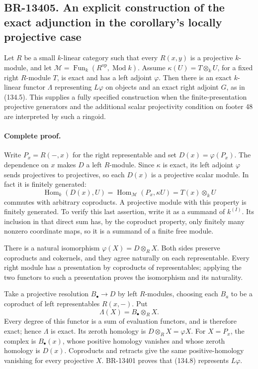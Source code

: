\subsection{BR-13405. An explicit construction of the exact adjunction in the corollary's locally projective case}
Let \(R\) be a small \(k\)-linear category such that every
\(R(x,y)\) is a projective \(k\)-module, and let
\(\mathcal M=\operatorname{Fun}_k(R^{\mathrm{op}},\operatorname{Mod}k)\).
Assume \(\kappa(U)=T\otimes_k U\), for a fixed right \(R\)-module
\(T\), is exact and has a left adjoint \(\varphi\).  Then there
is an exact \(k\)-linear functor \(\Lambda\) representing
\(L\varphi\) on objects and an exact right adjoint \(G\), as in
(134.5).  This supplies a fully specified construction when the
finite-presentation projective generators and the additional scalar
projectivity condition on footer 48 are interpreted by such a ringoid.

\paragraph{Complete proof.}
Write \(P_x=R(-,x)\) for the right representable and set
\(D(x)=\varphi(P_x)\).  The dependence on \(x\) makes \(D\) a
left \(R\)-module.  Since \(\kappa\) is exact, its left adjoint
\(\varphi\) sends projectives to projectives, so each \(D(x)\)
is a projective scalar module.  In fact it is finitely generated:
\[
 \operatorname{Hom}_k(D(x),U)
   =\operatorname{Hom}_{\mathcal M}(P_x,\kappa U)
   =T(x)\otimes_k U
\]
commutes with arbitrary coproducts.  A projective module with this
property is finitely generated.  To verify this last assertion, write
it as a summand of \(k^{(I)}\).  Its inclusion in that direct sum
has, by the coproduct property, only finitely many nonzero coordinate
maps, so it is a summand of a finite free module.

There is a natural isomorphism \(\varphi(X)=D\otimes_R X\).
Both sides preserve coproducts and cokernels, and they agree naturally
on each representable.  Every right module has a presentation by
coproducts of representables; applying the two functors to such a
presentation proves the isomorphism and its naturality.

Take a projective resolution \(B_\bullet\to D\) by left
\(R\)-modules, choosing each \(B_a\) to be a coproduct of left
representables \(R(x,-)\).  Put
\[
 \Lambda(X)=B_\bullet\otimes_R X.
 \tag{134.8}
\]
Every degree of this functor is a sum of evaluation functors, and is
therefore exact; hence \(\Lambda\) is exact.  Its zeroth homology
is \(D\otimes_R X=\varphi X\).  For \(X=P_x\), the complex is
\(B_\bullet(x)\), whose positive homology vanishes and whose zeroth
homology is \(D(x)\).  Coproducts and retracts give the same
positive-homology vanishing for every projective \(X\).
BR-13401 proves that (134.8) represents \(L\varphi\).

